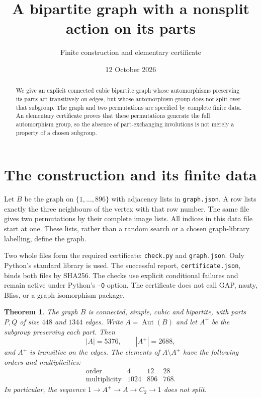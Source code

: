 \documentclass[11pt,a4paper]{article}
\title{A bipartite graph with a nonsplit action on its parts}
\author{Finite construction and elementary certificate}
\date{12 October 2026}
\newtheorem{theorem}{Theorem}
\begin{document}
\maketitle
\begin{abstract}
We give an explicit connected cubic bipartite graph whose automorphisms
preserving its parts act transitively on edges, but whose automorphism group
does not split over that subgroup.  The graph and two permutations are
specified by complete finite data.  An elementary certificate proves that
these permutations generate the full automorphism group, so the absence of
part-exchanging involutions is not merely a property of a chosen subgroup.
\end{abstract}

\section{The construction and its finite data}
Let $B$ be the graph on $\{1,\ldots,896\}$ with adjacency lists in
\texttt{graph.json}.  A row lists exactly the three neighbours of the vertex
with that row number.  The same file gives two permutations by their complete
image lists.  All indices in this data file start at one.  These lists, rather
than a random search or a chosen graph-library labelling, define the graph.

Two whole files form the required certificate: \texttt{check.py} and
\texttt{graph.json}.  Only Python's standard library is used.  The successful
report, \texttt{certificate.json}, binds both files by SHA256.  The checks use
explicit conditional failures and remain active under Python's \texttt{-O}
option.  The certificate does not call GAP, nauty, Bliss, or a graph
isomorphism package.

\begin{theorem}\label{thm:graph}
The graph $B$ is connected, simple, cubic and bipartite, with parts $P,Q$ of
size $448$ and $1344$ edges.  Write $A=\operatorname{Aut}(B)$ and let $A^+$
be the subgroup preserving each part.  Then
\[
 |A|=5376,\qquad |A^+|=2688,
\]
and $A^+$ is transitive on the edges.  The elements of $A\setminus A^+$
have the following orders and multiplicities:
\[
\begin{array}{c|rrr}
\text{order}&4&12&28\\ \hline
\text{multiplicity}&1024&896&768.
\end{array}
\]
In particular, the sequence
$1\longrightarrow A^+\longrightarrow A\longrightarrow C_2\longrightarrow1$
does not split.
\end{theorem}
\end{document}
